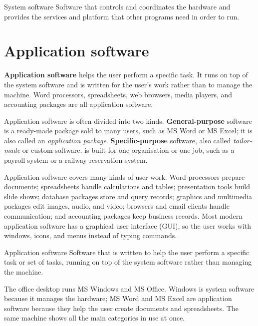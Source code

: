 \begin{definitionbox}{System software}
Software that controls and coordinates the hardware and provides the services
and platform that other programs need in order to run.
\end{definitionbox}

\section{Application software}
\textbf{Application software} helps the user perform a specific task. It runs
on top of the system software and is written for the user's work rather than
to manage the machine. Word processors, spreadsheets, web browsers, media
players, and accounting packages are all application software.

Application software is often divided into two kinds. \textbf{General-purpose}
software is a ready-made package sold to many users, such as MS Word or MS
Excel; it is also called an \emph{application package}. \textbf{Specific-purpose}
software, also called \emph{tailor-made} or custom software, is built for one
organisation or one job, such as a payroll system or a railway reservation
system.

Application software covers many kinds of user work. Word processors prepare
documents; spreadsheets handle calculations and tables; presentation tools
build slide shows; database packages store and query records; graphics and
multimedia packages edit images, audio, and video; browsers and email clients
handle communication; and accounting packages keep business records. Most
modern application software has a graphical user interface (GUI), so the user
works with windows, icons, and menus instead of typing commands.

\begin{definitionbox}{Application software}
Software that is written to help the user perform a specific task or set of
tasks, running on top of the system software rather than managing the machine.
\end{definitionbox}

\begin{example}
The office desktop runs MS Windows and MS Office. Windows is system software
because it manages the hardware; MS Word and MS Excel are application software
because they help the user create documents and spreadsheets. The same machine
shows all the main categories in use at once.
\end{example}

